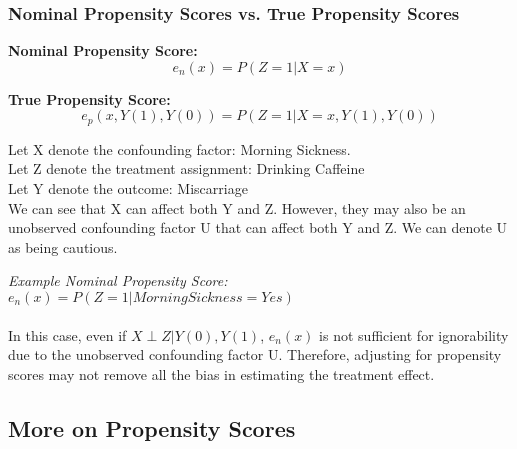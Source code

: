 \subsubsection{Nominal Propensity Scores vs. True Propensity Scores}

\textbf{Nominal Propensity Score:} 
$$e_{n}(x) = P(Z = 1 | X = x)$$

\textbf{True Propensity Score:}
$$e_{p}(x, Y(1), Y(0)) = P(Z = 1 | X = x, Y(1), Y(0))$$

Let X denote the confounding factor: Morning Sickness.\\
Let Z denote the treatment assignment: Drinking Caffeine\\
Let Y denote the outcome: Miscarriage\\
We can see that X can affect both Y and Z. However, they may also be an unobserved confounding factor U that can affect both Y and Z. We can denote U as being cautious.

\begin{center}
\end{center}

\textit{Example Nominal Propensity Score:}
$e_n(x) = P(Z = 1 | Morning Sickness = Yes)$\\\\
In this case, even if $X \perp Z | Y(0), Y(1)$, $e_n(x)$ is not sufficient for ignorability due to the unobserved confounding factor U. Therefore, adjusting for propensity scores may not remove all the bias in estimating the treatment effect.

\subsection{More on Propensity Scores}


